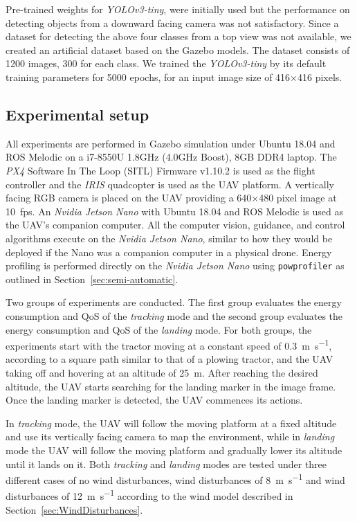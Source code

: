 \documentclass[conference]{IEEEtran}
\newcommand{\stt}[1]{{\small\tt #1}} %
\newcommand{\powprof}{\stt{powprofiler}}
\begin{document}
Pre-trained weights for \emph{YOLOv3-tiny}, were initially used but the
performance on detecting objects from a downward facing camera was
not satisfactory. Since a dataset for detecting the above four classes
from a top view was not available, we created an artificial dataset
based on the Gazebo models. The dataset consists of 1200 images, 300
for each class. We trained the \emph{YOLOv3-tiny} by its default training
parameters for 5000 epochs, for an input image size of 416$\times$416
pixels.


\subsection{Experimental setup}

All experiments are performed in Gazebo simulation under Ubuntu 18.04
and ROS Melodic on a i7-8550U 1.8GHz (4.0GHz Boost), 8GB DDR4
laptop. The \emph{PX4} Software In The Loop (SITL) Firmware v1.10.2 is used as the flight
controller and the \emph{IRIS} quadcopter is used as the UAV platform. A
vertically facing RGB camera is placed on the UAV providing a
640$\times$480 pixel image at 10~fps. An \emph{Nvidia Jetson Nano}
with Ubuntu 18.04 and ROS Melodic is used as the UAV's companion
computer. All the computer vision, guidance, and control algorithms 
execute on the \emph{Nvidia Jetson Nano}, similar to how they would
be deployed if the Nano was a companion computer in a physical drone.
%
Energy profiling is performed directly on the \emph{Nvidia Jetson
  Nano} using \powprof{} as outlined in Section~\ref{sec:semi-automatic}.

Two groups of experiments are conducted. The first group evaluates the
energy consumption and QoS of the \emph{tracking} mode and the second group
evaluates the energy consumption and QoS of the \emph{landing} mode. For
both groups, the experiments start with the tractor moving at a
constant speed of \SI{0.3}{\meter\per\second}, according to a square path similar to that of a
plowing tractor, and the UAV taking off and hovering at an altitude of
\SI{25}{\meter}. After reaching the desired altitude, the UAV starts searching
for the landing marker in the image frame. Once the landing marker is
detected, the UAV commences its actions.

In \emph{tracking} mode, the UAV will follow the moving platform at a fixed
altitude and use its vertically facing camera to map the environment,
while in \emph{landing} mode the UAV will follow the moving platform and
gradually lower its altitude until it lands on it. Both \emph{tracking} and
\emph{landing} modes are tested under three different cases of no wind
disturbances, wind disturbances of \SI{8}{\meter \per \second} and wind disturbances of
\SI{12}{\meter \per \second} according to the wind model described in Section~\ref{sec:WindDisturbances}.
\end{document}

